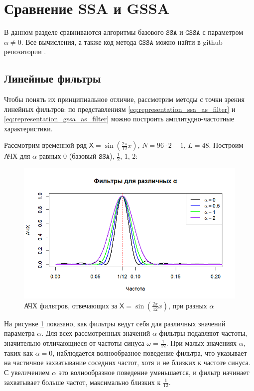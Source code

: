 \documentclass[12pt, specialist, subf
]{disser}
\theoremstyle{definition}
\newcommand{\SSA}{\texttt{SSA}}
\newcommand{\GSSA}{\texttt{GSSA}}
\newcommand{\TS}{\mathsf{X}}
\begin{document}
\section{Сравнение SSA и GSSA}
\label{sec:compare_ssa_gssa}
В данном разделе сравниваются алгоритмы базового $\SSA$ и $\GSSA$ с параметром $\alpha \not = 0$. Все вычисления, а также код метода $\GSSA$ можно найти в github репозитории \cite{spbu_cissa_coursework_github}.


\subsection{Линейные фильтры}
Чтобы понять их принципиальное отличие, рассмотрим методы с точки зрения линейных фильтров: по представлениям \eqref{eq:representation_ssa_as_filter} и \eqref{eq:representation_gssa_as_filter} можно построить амплитудно-частотные характеристики.

Рассмотрим временной ряд $\TS = \sin\left(\frac{2\pi}{12}x\right)$, $N = 96 \cdot 2 - 1$, $L = 48$.
Построим АЧХ для $\alpha$ равных $0$ (базовый $\SSA$), $\frac{1}{2}$, $1$, $2$:
\begin{figure}[H]
	\centering
	\includegraphics[width=1\textwidth]{img/various_alphas.png}
	\caption{АЧХ фильтров, отвечающих за $\TS = \sin\left(\frac{2\pi}{12}x\right)$, при разных $\alpha$}
	\label{fig:various_alphas}
\end{figure}
На рисунке \ref{fig:various_alphas} показано, как фильтры ведут себя для различных значений параметра \(\alpha\). Для всех рассмотренных значений \(\alpha\) фильтры подавляют частоты, значительно отличающиеся от частоты синуса $ \omega = \frac{1}{12}$. При малых значениях \(\alpha\), таких как \(\alpha = 0\), наблюдается волнообразное поведение фильтра, что указывает на частичное захватывание соседних частот, хотя и не близких к частоте синуса. С увеличением \(\alpha\) это волнообразное поведение уменьшается, и фильтр начинает захватывает больше частот, максимально близких к \(\frac{1}{12}\).
\end{document}
